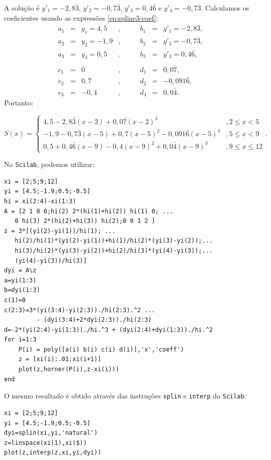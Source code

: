 \begin{sol}
A solução é  $y'_1=-2,8\bar{3}$, $y'_2=-0,7\bar{3}$, $y'_3=0,4\bar{6}$ e $y'_4=-0,7\bar{3}$. Calculamos os coeficientes usando as expressões \eqref{eq:spline3-coef}:
\begin{equation*}
	\begin{array}{lclclcl}
		a_1&=&y_1=4,5&, \qquad&b_1 &=&y'_1=-2,8\bar{3}, \\
		a_2&=&y_2=-1,9&, \qquad&b_2&=&y'_2=-0,7\bar{3}, \\
		a_3&=&y_3=0,5&. \qquad&b_3&=&y'_3=0,4\bar{6}, \\
		&&&&&&\\
		c_1&=&0&, \qquad&d_1&=&0,0\bar{7}, \\
		c_2&=&0,7&, \qquad&d_2&=&-0,091\bar{6}, \\
		c_3&=&-0,4&, \qquad&d_3&=&0,0\bar{4}.
	\end{array}
\end{equation*}
Portanto:
\begin{small}
	\begin{equation*}
		S(x)=\left\{\begin{array}{ll}
			4,5-2,8\bar{3}(x-2)+0,0\bar{7}(x-2)^3 &\!, 2\leq x<5\\
			-1,9-0,7\bar{3}(x-5)+0,7(x-5)^2-0,091\bar{6}(x-5)^3 &\!, 5\leq x<9\\
			0,5+0,4\bar{6}(x-9)-0,4(x-9)^2+0,0\bar{4}(x-9)^3 &\!, 9\leq x\leq 12
		\end{array}\right. .
	\end{equation*}  
\end{small}

\ifisscilab
No \verb+Scilab+, podemos utilizar:
\begin{verbatim}
xi = [2;5;9;12]
yi = [4.5;-1.9;0.5;-0.5]
hi = xi(2:4)-xi(1:3)
A = [2 1 0 0;hi(2) 2*(hi(1)+hi(2)) hi(1) 0; ...
   0 hi(3) 2*(hi(2)+hi(3)) hi(2);0 0 1 2 ]
z = 3*[(yi(2)-yi(1))/hi(1); ...
   hi(2)/hi(1)*(yi(2)-yi(1))+hi(1)/hi(2)*(yi(3)-yi(2));...
   hi(3)/hi(2)*(yi(3)-yi(2))+hi(2)/hi(3)*(yi(4)-yi(3));...
   (yi(4)-yi(3))/hi(3)]
dyi = A\z
a=yi(1:3)
b=dyi(1:3)
c(1)=0
c(2:3)=3*(yi(3:4)-yi(2:3))./hi(2:3).^2 ...
         - (dyi(3:4)+2*dyi(2:3))./hi(2:3)
d=-2*(yi(2:4)-yi(1:3))./hi.^3 + (dyi(2:4)+dyi(1:3))./hi.^2
for i=1:3
    P(i) = poly([a(i) b(i) c(i) d(i)],'x','coeff')
    z = [xi(i):.01:xi(i+1)]
    plot(z,horner(P(i),z-xi(i)))
end
\end{verbatim}

O mesmo resultado é obtido através das instruções \verb+splin+ e \verb+interp+ do \verb+Scilab+:
\begin{verbatim}
xi = [2;5;9;12]
yi = [4.5;-1.9;0.5;-0.5]
dyi=splin(xi,yi,'natural')
z=linspace(xi(1),xi($))
plot(z,interp(z,xi,yi,dyi))
\end{verbatim}
\fi
\end{sol}

